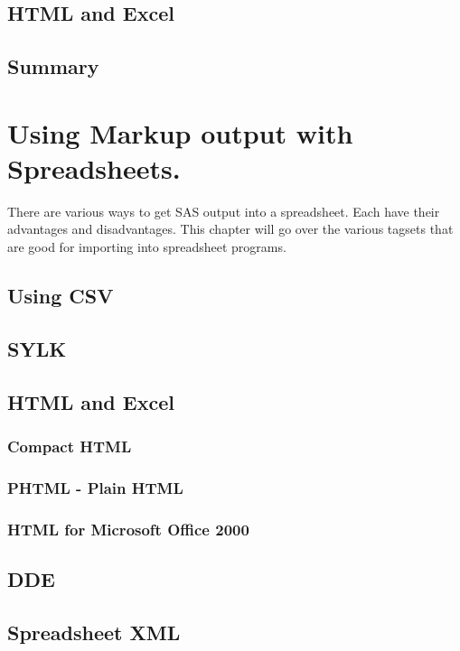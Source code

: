 \documentclass{book}
\begin{document}
\section{HTML and Excel}

\section{Summary}

\chapter{Using Markup output with Spreadsheets.}
There are various ways to get SAS output into a spreadsheet.
Each have their advantages and disadvantages.  This chapter
will go over the various tagsets that are good for importing into
spreadsheet programs.
\section{Using CSV}

\section{SYLK}

\section{HTML and Excel}

\subsection{Compact HTML}

\subsection{PHTML - Plain HTML}

\subsection{HTML for Microsoft Office 2000}

\section{DDE}

\section{Spreadsheet XML}
\end{document}
